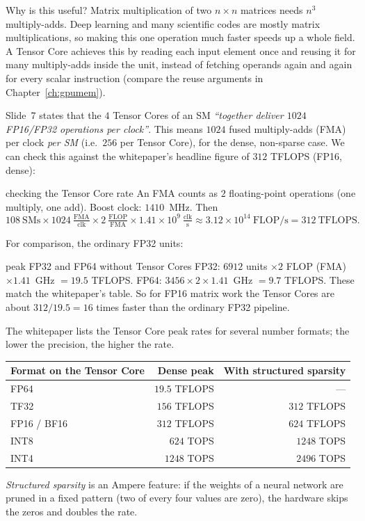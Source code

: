 Why is this useful? Matrix multiplication of two $n\times n$ matrices needs $n^{3}$ multiply-adds. Deep learning and many scientific codes are mostly matrix multiplications, so making
this one operation much faster speeds up a whole field. A Tensor Core achieves this by reading each input element once and reusing it
for many multiply-adds inside the unit, instead of fetching operands again and again for every scalar instruction (compare the reuse arguments in Chapter~\ref{ch:gpumem}).

Slide~7 states that the $4$ Tensor Cores of an SM \emph{``together deliver $1024$ FP16/FP32 operations per clock''}. This means $1024$ fused multiply-adds (FMA) per clock \emph{per SM}
(i.e.\ $256$ per Tensor Core), for the dense, non-sparse case. We can check this against the whitepaper's headline figure of $312$ TFLOPS (FP16, dense):

\begin{workedex}{checking the Tensor Core rate}
An FMA counts as $2$ floating-point operations (one multiply, one add). Boost clock: $1410$~MHz. Then
\[
 108\ \text{SMs}\times1024\ \tfrac{\text{FMA}}{\text{clk}}\times2\ \tfrac{\text{FLOP}}{\text{FMA}}\times1.41\times10^{9}\ \tfrac{\text{clk}}{\text{s}}
 \approx 3.12\times10^{14}\ \text{FLOP/s}=312\ \text{TFLOPS}.
\]
\end{workedex}

For comparison, the ordinary FP32 units:
\begin{workedex}{peak FP32 and FP64 without Tensor Cores}
FP32: $6912$ units $\times2$ FLOP (FMA) $\times1.41$~GHz $=19.5$ TFLOPS. FP64: $3456\times2\times1.41$~GHz $=9.7$ TFLOPS.
These match the whitepaper's table. So for FP16 matrix work the Tensor Cores are about $312/19.5=16$ times faster than the ordinary FP32 pipeline.
\end{workedex}

The whitepaper lists the Tensor Core peak rates for several number formats; the lower the precision, the higher the rate.
\begin{center}\small
\begin{tabular}{@{}lrr@{}}
\toprule
\textbf{Format on the Tensor Core} & \textbf{Dense peak} & \textbf{With structured sparsity}\\
\midrule
FP64 & $19.5$ TFLOPS & ---\\
TF32 & $156$ TFLOPS & $312$ TFLOPS\\
FP16 / BF16 & $312$ TFLOPS & $624$ TFLOPS\\
INT8 & $624$ TOPS & $1248$ TOPS\\
INT4 & $1248$ TOPS & $2496$ TOPS\\
\bottomrule
\end{tabular}
\end{center}
\emph{Structured sparsity} is an Ampere feature: if the weights of a neural network are pruned in a fixed pattern (two of every four values are zero), the hardware skips the zeros and doubles the rate.

